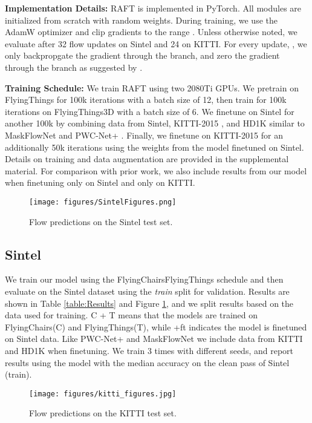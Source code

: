 \documentclass[runningheads]{llncs}
\begin{document}
\smallskip \noindent \textbf{Implementation Details: }
RAFT is implemented in PyTorch\cite{pytorch}. All modules are initialized from scratch with random weights. During training, we use the AdamW\cite{adamw} optimizer and clip gradients to the range . Unless otherwise noted, we evaluate after 32 flow updates on Sintel and 24 on KITTI. For every update, , we only backpropgate the gradient through the  branch, and zero the gradient through the  branch as suggested by \cite{flowelements}.

\smallskip \noindent \textbf{Training Schedule: }
We train RAFT using two 2080Ti GPUs. We pretrain on FlyingThings for 100k iterations with a batch size of 12, then train for 100k iterations on FlyingThings3D with a batch size of 6. We finetune on Sintel for another 100k by combining data from Sintel\cite{sintel}, KITTI-2015 \cite{menze2015object}, and HD1K\cite{hd1k} similar to MaskFlowNet \cite{maskflownet} and PWC-Net+ \cite{pwcnet+}. Finally, we finetune on KITTI-2015 for an additionally 50k iterations using the weights from the model finetuned on Sintel. Details on training and data augmentation are provided in the supplemental material. For comparison with prior work, we also include results from our model when finetuning only on Sintel and only on KITTI.



\begin{figure}[t]
    \centering
	\texttt{[image: figures/SintelFigures.png]}
	\caption{Flow predictions on the Sintel test set. }
	\label{fig:Sintel}
\end{figure}


\subsection{Sintel}
We train our model using the FlyingChairsFlyingThings schedule and then evaluate on the Sintel dataset using the \emph{train} split for validation. Results are shown in Table \ref{table:Results} and Figure \ref{fig:Sintel}, and we split results based on the data used for training. C + T means that the models are trained on FlyingChairs(C) and FlyingThings(T), while +ft indicates the model is finetuned on Sintel data. Like PWC-Net+\cite{pwcnet+} and MaskFlowNet \cite{maskflownet} we include data from KITTI and HD1K when finetuning. We train 3 times with different seeds, and report results using the model with the median accuracy on the clean pass of Sintel (train).

\begin{figure}[t]
    \centering
	\texttt{[image: figures/kitti\_figures.jpg]}
	\caption{Flow predictions on the KITTI test set.}
	\label{fig:KITTI}
\end{figure}
\end{document}
